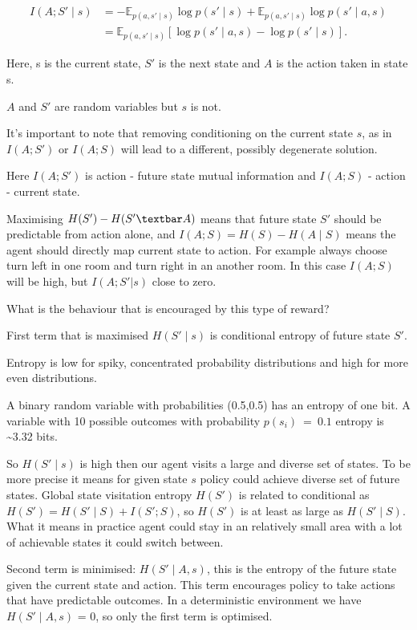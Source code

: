 \begin{equation}
\begin{aligned}
I(A;S'\mid s)
&= -\mathbb{E}_{p(a,s'\mid s)}\log p(s'\mid s)
   +\mathbb{E}_{p(a,s'\mid s)}\log p(s'\mid a,s) \\
&= \mathbb{E}_{p(a,s'\mid s)}
   \left[\log p(s'\mid a,s)-\log p(s'\mid s)\right].
\end{aligned}
\label{eq:empowerment-log-ratio}
\end{equation}

Here, s is the current state, $S'$ is the next state and $A$ is the action taken in state s.

$A$ and $S'$ are random variables but $s$ is not.

It's important to note that removing conditioning on the current state $s$, as in $I(A;S')$ or $I(A; S)$ will lead to a different, possibly degenerate solution.

Here $I(A;S')$ is action - future state mutual information and  $I(A; S)$ - action - current state.

Maximising $H(S') - H(S'\textbar A)$ means that future state $S'$ should be predictable from action alone, and $I(A; S) = H(S) - H(A \mid S)$ means the agent should directly map current state to action. For example always choose turn left in one room and turn right in an another room. In this case $I(A;S)$ will be high, but $I(A;S'|s)$ close to zero.

What is the behaviour that is encouraged by this type of reward?

First term that is maximised $H(S' \mid s)$ is conditional entropy of future state $S'$.

Entropy is low for spiky, concentrated probability distributions and high for more even distributions.

A binary random variable with probabilities (0.5,0.5) has an entropy of one bit. A variable with 10 possible outcomes with probability $p(s_{i})\  = \ 0.1$ entropy is \textasciitilde3.32 bits.

So $H(S' \mid s)$ is high then our agent visits a large and diverse set of states. To be more precise it means for given state $s$ policy could achieve diverse set of future states. Global state visitation entropy $H(S')$ is related to conditional as $H(S')=H(S'∣S)+I(S';S)$, so $H(S')$ is at least as large as $H(S'∣S)$. What it means in practice agent could stay in an relatively small area with a lot of achievable states it could switch between.

Second term is minimised: $H(S' \mid A,s)$, this is the entropy of the future state given the current state and action. This term encourages policy to take actions that have predictable outcomes. In a deterministic environment we have $H(S' \mid A,s)$ = 0, so only the first term is optimised.

